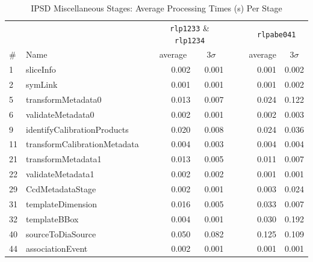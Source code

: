 \begin{table}[htbp]
\begin{center}
\caption{IPSD Miscellaneous Stages: Average Processing Times (s) Per Stage
\label{tbl:miscstagetimes}}
\small
\vspace{\baselineskip}
\begin{tabular}{llcrrc|crr}
\hline\hline
   &      && \multicolumn{2}{c}{{\tt rlp1233} \& {\tt rlp1234}} 
         &&& \multicolumn{2}{c}{{\tt rlpabe041}} \\
\# & Name && \multicolumn{1}{c}{average}&\multicolumn{1}{c}{$3\sigma$} 
         &&& \multicolumn{1}{c}{average}&\multicolumn{1}{c}{$3\sigma$} \\ 
\hline
 1 &                     sliceInfo &&  0.002 &  0.001 &&&  0.001 &  0.002 \\
 2 &                       symLink &&  0.001 &  0.001 &&&  0.001 &  0.002 \\
 5 &            transformMetadata0 &&  0.013 &  0.007 &&&  0.024 &  0.122 \\
 6 &             validateMetadata0 &&  0.002 &  0.001 &&&  0.002 &  0.003 \\
 9 &   identifyCalibrationProducts &&  0.020 &  0.008 &&&  0.024 &  0.036 \\
11 &  transformCalibrationMetadata &&  0.004 &  0.003 &&&  0.004 &  0.004 \\
21 &            transformMetadata1 &&  0.013 &  0.005 &&&  0.011 &  0.007 \\
22 &             validateMetadata1 &&  0.002 &  0.002 &&&  0.001 &  0.001 \\
29 &              CcdMetadataStage &&  0.002 &  0.001 &&&  0.003 &  0.024 \\
31 &             templateDimension &&  0.016 &  0.005 &&&  0.033 &  0.007 \\
32 &                  templateBBox &&  0.004 &  0.001 &&&  0.030 &  0.192 \\
40 &             sourceToDiaSource &&  0.050 &  0.082 &&&  0.125 &  0.109 \\
44 &              associationEvent &&  0.002 &  0.001 &&&  0.001 &  0.001 \\
\hline
\end{tabular}
\end{center}
\end{table}

